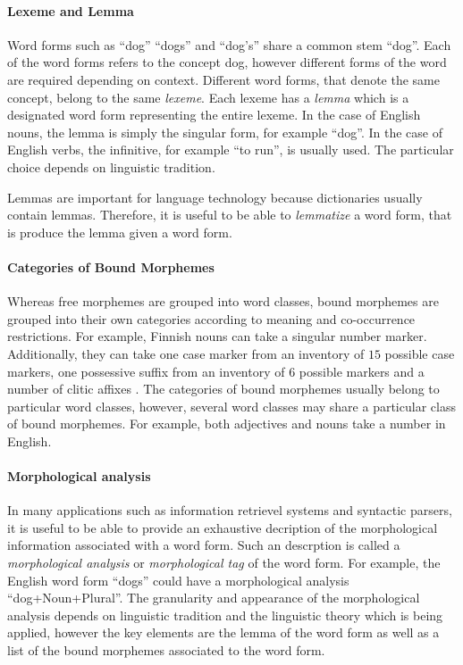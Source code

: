 \paragraph{Lexeme and Lemma} Word forms such as ``dog'' ``dogs'' and
``dog's'' share a common stem ``dog''. Each of the word forms refers
to the concept {\sc dog}, however different forms of the word are
required depending on context. Different word forms, that denote the
same concept, belong to the same {\it lexeme}. Each lexeme has a {\it
  lemma} which is a designated word form representing the entire
lexeme. In the case of English nouns, the lemma is simply the singular
form, for example ``dog''. In the case of English verbs, the
infinitive, for example ``to run'', is usually used. The particular
choice depends on linguistic tradition. 

Lemmas are important for language technology because dictionaries
usually contain lemmas. Therefore, it is useful to be able to {\it
  lemmatize} a word form, that is produce the lemma given a word form.

\paragraph{Categories of Bound Morphemes} Whereas free morphemes are
grouped into word classes, bound morphemes are grouped into their own
categories according to meaning and co-occurrence restrictions. For
example, Finnish nouns can take a singular number
marker. Additionally, they can take one case marker from an inventory
of $15$ possible case markers, one possessive suffix from an inventory
of $6$ possible markers and a number of clitic affixes
\citep{Hakulinen2004}. The categories of bound morphemes usually
belong to particular word classes, however, several word classes may
share a particular class of bound morphemes. For example, both
adjectives and nouns take a number in English.

\paragraph{Morphological analysis} In many applications such as
information retrievel systems and syntactic parsers, it is useful to
be able to provide an exhaustive decription of the morphological
information associated with a word form. Such an descrption is called
a {\it morphological analysis} or {\it morphological tag} of the word
form. For example, the English word form ``dogs'' could have a
morphological analysis ``dog+Noun+Plural''. The granularity and
appearance of the morphological analysis depends on linguistic
tradition and the linguistic theory which is being applied, however
the key elements are the lemma of the word form as well as a list of
the bound morphemes associated to the word form.

